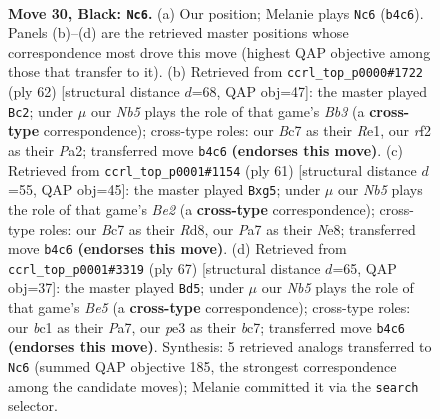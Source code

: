 \documentclass[11pt]{article}
\begin{document}
\clearpage

\begin{figure}[p]\centering
\begin{subfigure}{0.46\textwidth}\centering
\resizebox{\linewidth}{!}{%
\newchessgame
\chessboard[
  setfen={4r1k1/pBbb2pp/P4n2/1p3p2/1n3P2/1P2P1P1/5R2/RNB3K1 b - - 9 30},
  showmover=false,
  pgfstyle=straightmove, color=movearrow, markmove={b4-c6}
]}
\caption{}
\end{subfigure}\hfill
\begin{subfigure}{0.46\textwidth}\centering
\resizebox{\linewidth}{!}{%
\newchessgame
\chessboard[
  setfen={6rr/p4p2/1k1np2b/3p4/1p1N4/1B1P1NP1/PP5P/1K2R3 w - - 3 32},
  showmover=false,
  pgfstyle=straightmove, color=movearrow, markmove={b3-c2}
]}
\caption{}
\end{subfigure}
\\[4pt]
\begin{subfigure}{0.46\textwidth}\centering
\resizebox{\linewidth}{!}{%
\newchessgame
\chessboard[
  setfen={3rn1k1/1pp1bp2/2n1b3/4p1Pp/1P2P3/2PBN1P1/1B3P2/R3N1K1 b - - 0 31},
  showmover=false,
  pgfstyle=straightmove, color=movearrow, markmove={e7-g5}
]}
\caption{}
\end{subfigure}\hfill
\begin{subfigure}{0.46\textwidth}\centering
\resizebox{\linewidth}{!}{%
\newchessgame
\chessboard[
  setfen={4r3/ppB1k1p1/2p3Pp/2n2p1P/4b3/1P4K1/P1PR4/3B4 b - - 2 34},
  showmover=false,
  pgfstyle=straightmove, color=movearrow, markmove={e4-d5}
]}
\caption{}
\end{subfigure}
\caption{\textbf{Move 30, Black: \texttt{Nc6}.} (a) Our position; Melanie plays \texttt{Nc6} (\texttt{b4c6}). Panels (b)--(d) are the retrieved master positions whose correspondence most drove this move (highest QAP objective among those that transfer to it). (b) Retrieved from \texttt{ccrl\_top\_p0000\#1722} (ply 62) [structural distance $d$=68, QAP obj=47]: the master played \texttt{Bc2}; under $\mu$ our \emph{Nb5} plays the role of that game's \emph{Bb3} (a \textbf{cross-type} correspondence); cross-type roles: our \emph{B}c7 as their \emph{R}e1, our \emph{r}f2 as their \emph{P}a2; transferred move \texttt{b4c6} \textbf{(endorses this move)}. (c) Retrieved from \texttt{ccrl\_top\_p0001\#1154} (ply 61) [structural distance $d$=55, QAP obj=45]: the master played \texttt{Bxg5}; under $\mu$ our \emph{Nb5} plays the role of that game's \emph{Be2} (a \textbf{cross-type} correspondence); cross-type roles: our \emph{B}c7 as their \emph{R}d8, our \emph{P}a7 as their \emph{N}e8; transferred move \texttt{b4c6} \textbf{(endorses this move)}. (d) Retrieved from \texttt{ccrl\_top\_p0001\#3319} (ply 67) [structural distance $d$=65, QAP obj=37]: the master played \texttt{Bd5}; under $\mu$ our \emph{Nb5} plays the role of that game's \emph{Be5} (a \textbf{cross-type} correspondence); cross-type roles: our \emph{b}c1 as their \emph{P}a7, our \emph{p}e3 as their \emph{b}c7; transferred move \texttt{b4c6} \textbf{(endorses this move)}. Synthesis: 5 retrieved analogs transferred to \texttt{Nc6} (summed QAP objective 185, the strongest correspondence among the candidate moves); Melanie committed it via the \texttt{search} selector.}
\label{fig:thought-m59}
\end{figure}
\end{document}

